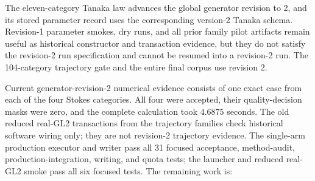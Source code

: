 \documentclass[11pt]{article}
\begin{document}
The eleven-category Tanaka law advances the global generator revision to 2,
and its stored parameter record uses the corresponding version-2 Tanaka
schema.  Revision-1 parameter smokes, dry runs, and all prior family pilot
artifacts remain useful as historical constructor and transaction evidence,
but they do not satisfy the revision-2 run specification and cannot be
resumed into a revision-2 run.  The 104-category trajectory gate and the
entire final corpus use revision 2.

Current generator-revision-2 numerical evidence consists of one exact case
from each of the four Stokes categories.  All four were accepted, their
quality-decision masks were zero, and the complete calculation took
$4.6875$ seconds.  The old reduced real-GL2 transactions from the trajectory
families check historical software wiring only; they are not revision-2
trajectory evidence.  The single-arm production
executor and writer pass all 31 focused acceptance, method-audit,
production-integration, writing, and quota tests; the launcher and reduced
real-GL2 smoke pass all six focused tests.  The remaining work is:
\end{document}
